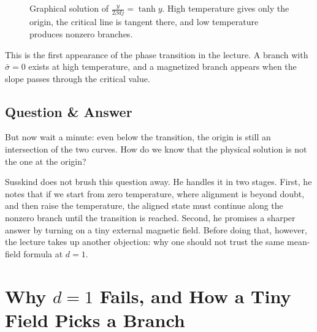 \begin{figure}[ht]
\centering
{}
\caption{Graphical solution of \(\frac{y}{2\beta d j}=\tanh y\). High temperature gives only the origin, the critical line is tangent there, and low temperature produces nonzero branches.}
\end{figure}

This is the first appearance of the phase transition in the lecture. A branch with \(\bar{\sigma}=0\) exists at high temperature, and a magnetized branch appears when the slope passes through the critical value.

\subsection{Question \& Answer}

But now wait a minute: even below the transition, the origin is still an intersection of the two curves. How do we know that the physical solution is not the one at the origin?

Susskind does not brush this question away. He handles it in two stages. First, he notes that if we start from zero temperature, where alignment is beyond doubt, and then raise the temperature, the aligned state must continue along the nonzero branch until the transition is reached. Second, he promises a sharper answer by turning on a tiny external magnetic field. Before doing that, however, the lecture takes up another objection: why one should not trust the same mean-field formula at \(d=1\).

\section{Why \(d=1\) Fails, and How a Tiny Field Picks a Branch}

